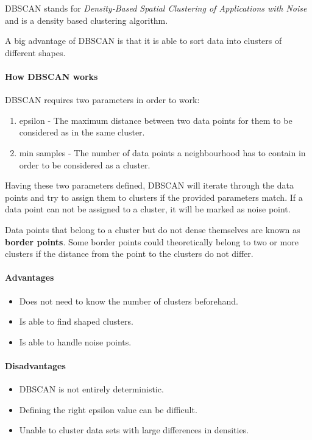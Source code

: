 DBSCAN stands for \textit{Density-Based Spatial Clustering of Applications with Noise}
and is a density based clustering algorithm.

A big advantage of DBSCAN is that it is able to sort data into clusters
of different shapes.

\paragraph{How DBSCAN works}
DBSCAN requires two parameters in order to work:

\begin{enumerate}
    \item epsilon - The maximum distance between two data points for them to be considered as in the same cluster.
    \item min samples - The number of data points a neighbourhood has to contain in order to be considered as a cluster.
\end{enumerate}

Having these two parameters defined, DBSCAN will iterate through the data points
and try to assign them to clusters if the provided parameters match.
If a data point can not be assigned to a cluster, it will be marked as noise point.

Data points that belong to a cluster but do not dense themselves are known as \textbf{border points}.
Some border points could theoretically belong to two or more clusters
if the distance from the point to the clusters do not differ.

\paragraph{Advantages}
\begin{itemize}
    \item Does not need to know the number of clusters beforehand.
    \item Is able to find shaped clusters.
    \item Is able to handle noise points.
\end{itemize}

\paragraph{Disadvantages}
\begin{itemize}
    \item DBSCAN is not entirely deterministic.
    \item Defining the right epsilon value can be difficult.
    \item Unable to cluster data sets with large differences in densities.
\end{itemize}

